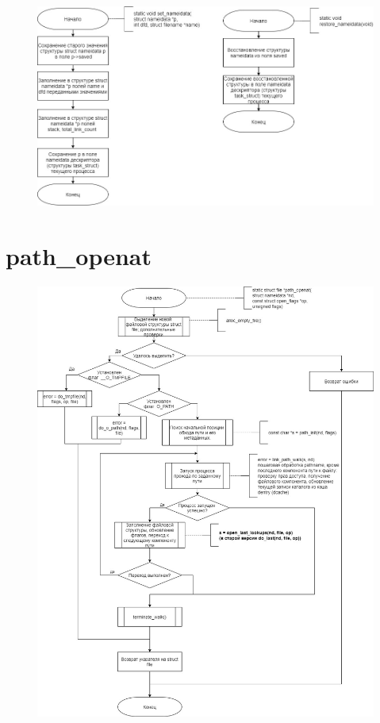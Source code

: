 \documentclass[a4paper,14pt]{extreport}
\begin{document}
\begin{figure}[H]
	\centering
	\includegraphics[scale=0.55]{img/nameidata.jpg}
\end{figure}




\section{path\_openat}

\begin{figure}[H]
	\centering
	\includegraphics[scale=0.45]{img/path_openat.jpg}
\end{figure}
\end{document}
